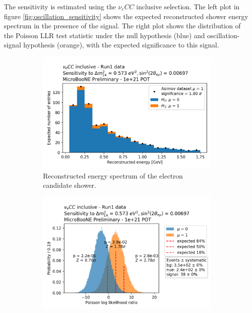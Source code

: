 \documentclass[a4paper]{article}
\newcommand{\nuecc}{$\nu_e CC$ }
\begin{document}
The sensitivity is estimated using the \nuecc inclusive selection.
The left plot in figure \ref{fig:oscillation_sensitivity} shows the expected reconstructed shower energy spectrum in the presence of the signal.
The right plot shows the distribution of the Poisson LLR test statistic under the null hypothesis (blue) and oscillation-signal hypothesis (orange), with the expected significance to this signal.

\begin{figure}[ht] 
\begin{center}
    \begin{subfigure}[b]{0.45\textwidth}
    \centering
    \includegraphics[width=1.00\textwidth]{Sensitivity/oscillation/pois_llr_asimov_plot_1e+21_deltam2_0573_sin2theta2_000697.png}
    \caption{Reconstructed energy spectrum of the electron candidate shower.}
    \end{subfigure}
    \begin{subfigure}[b]{0.45\textwidth}
    \centering
    \includegraphics[width=1.00\textwidth]{Sensitivity/oscillation/pois_llr_discovery_totalpot_1e+21_nosyst_deltam2_0573_sin2theta2_000697.png}

\end{subfigure}
\end{center}
\end{figure}
\end{document}
